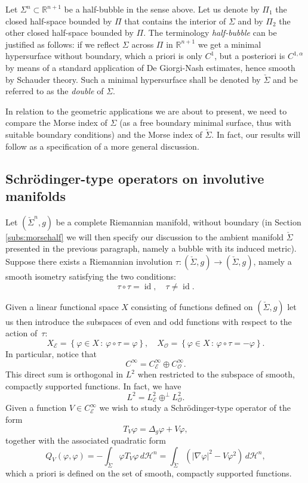 \documentclass[10pt]{amsart}
\let\mathcal\mathscr
\newcommand{\sep}{\,:\,}
\DeclareMathOperator{\id}{id}
\theoremstyle{definition}
\newcommand{\R}{\mathbb{R}}
\newcommand{\h}{\mathscr{H}}
\begin{document}
Let $\Sigma^n\subset \R^{n+1}$ be a half-bubble in the sense above. Let us denote by $\Pi_1$ the closed half-space bounded by $\Pi$ that contains the interior of $\Sigma$ and by $\Pi_2$ the other closed half-space bounded by $\Pi$. The terminology \emph{half-bubble} can be justified as follows: if we reflect $\Sigma$ across $\Pi$ in $\R^{n+1}$ we get a minimal hypersurface without boundary, which a priori is only $C^1$, but a posteriori is $C^{1,\alpha}$ by means of a standard application of De Giorgi-Nash estimates, hence smooth by Schauder theory. Such a minimal hypersurface shall be denoted by $\check{\Sigma}$ and be referred to as the \emph{double} of $\Sigma$.

In relation to the geometric applications we are about to present, we need to compare the Morse index of $\Sigma$ (as a free boundary minimal surface, thus with suitable boundary conditions) and the Morse index of $\check{\Sigma}$. In fact, our results will follow as a specification of a more general discussion.

\subsection{Schrödinger-type operators on involutive manifolds}\label{subs:general}

Let $(\check{\Sigma}^{n},g)$ be a complete Riemannian manifold, without boundary (in Section \ref{subs:morsehalf} we will then specify our discussion to the ambient manifold $\check{\Sigma}$ presented in the previous paragraph, namely a bubble with its induced metric). Suppose there exists a Riemannian involution $\tau:(\check{\Sigma},g) \to (\check{\Sigma},g)$, namely a smooth isometry satisfying the two conditions:
\[
\tau\circ\tau = \id, \quad \tau\neq \id.
\]

Given a linear functional space $X$ consisting of functions defined on $(\check{\Sigma},g)$ let us then introduce the subspaces of even and odd functions with respect to the action of~$\tau$:
\[
X_\mathcal{E}=\left\{\varphi\in X\sep \varphi\circ\tau=\varphi \right\}, \quad X_\mathcal{O}=\left\{\varphi\in X\sep \varphi\circ\tau=-\varphi \right\}.
\]
In particular, notice that
\[
C^{\infty}=C^{\infty}_{\mathcal{E}}\oplus C^{\infty}_{\mathcal{O}}.
\]
This direct sum is orthogonal in $L^2$ when restricted to the subspace of smooth, compactly supported functions. In fact, we have
\[
L^2=L^2_{\mathcal{E}}\oplus^{\perp} L^2_{\mathcal{O}}.
\]
Given a function $V\in C^{\infty}_{\mathcal{E}}$ we wish to study a Schrödinger-type operator of the form
\[
T_V\varphi=\Delta_g\varphi+V\varphi,
\]
together with the associated quadratic form
\[
Q_V(\varphi,\varphi)=-\int_{\check{\Sigma}}\varphi T_V \varphi\,d\h^n=\int_{\check{\Sigma}}(|\nabla \varphi|^2-V\varphi^2)\,d\h^n,
\]
which a priori is defined on the set of smooth, compactly supported functions.
\end{document}
